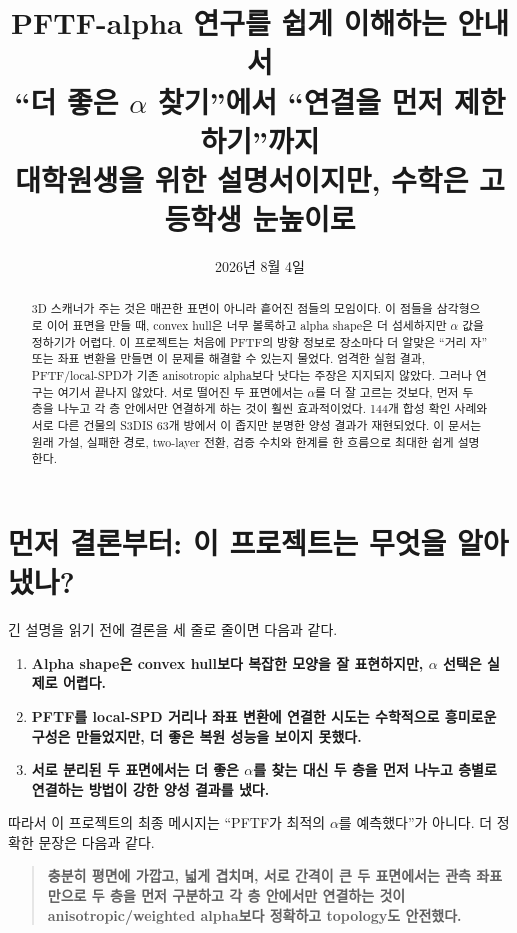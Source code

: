 \documentclass[11pt,a4paper]{article}
\title{\textbf{PFTF-alpha 연구를 쉽게 이해하는 안내서}\\[5pt]
\large ``더 좋은 $\alpha$ 찾기''에서 ``연결을 먼저 제한하기''까지\\[7pt]
\normalsize 대학원생을 위한 설명서이지만, 수학은 고등학생 눈높이로}
\author{}
\date{2026년 8월 4일}
\begin{document}
\maketitle
\thispagestyle{fancy}

\begin{abstract}
\noindent
3D 스캐너가 주는 것은 매끈한 표면이 아니라 흩어진 점들의 모임이다. 이 점들을
삼각형으로 이어 표면을 만들 때, convex hull은 너무 볼록하고 alpha shape은
더 섬세하지만 $\alpha$ 값을 정하기가 어렵다. 이 프로젝트는 처음에 PFTF의
방향 정보로 장소마다 더 알맞은 ``거리 자'' 또는 좌표 변환을 만들면 이 문제를
해결할 수 있는지 물었다. 엄격한 실험 결과, PFTF/local-SPD가 기존 anisotropic
alpha보다 낫다는 주장은 지지되지 않았다. 그러나 연구는 여기서 끝나지 않았다.
서로 떨어진 두 표면에서는 $\alpha$를 더 잘 고르는 것보다, 먼저 두 층을 나누고
각 층 안에서만 연결하게 하는 것이 훨씬 효과적이었다. 144개 합성 확인 사례와
서로 다른 건물의 S3DIS 63개 방에서 이 좁지만 분명한 양성 결과가 재현되었다.
이 문서는 원래 가설, 실패한 경로, two-layer 전환, 검증 수치와 한계를 한 흐름으로
최대한 쉽게 설명한다.
\end{abstract}

\tableofcontents
\newpage

\section{먼저 결론부터: 이 프로젝트는 무엇을 알아냈나?}

긴 설명을 읽기 전에 결론을 세 줄로 줄이면 다음과 같다.

\begin{enumerate}
  \item \textbf{Alpha shape은 convex hull보다 복잡한 모양을 잘 표현하지만,
  $\alpha$ 선택은 실제로 어렵다.}
  \item \textbf{PFTF를 local-SPD 거리나 좌표 변환에 연결한 시도는 수학적으로
  흥미로운 구성은 만들었지만, 더 좋은 복원 성능을 보이지 못했다.}
  \item \textbf{서로 분리된 두 표면에서는 더 좋은 $\alpha$를 찾는 대신 두 층을
  먼저 나누고 층별로 연결하는 방법이 강한 양성 결과를 냈다.}
\end{enumerate}

따라서 이 프로젝트의 최종 메시지는 ``PFTF가 최적의 $\alpha$를 예측했다''가
아니다. 더 정확한 문장은 다음과 같다.

\begin{quote}
\textbf{충분히 평면에 가깝고, 넓게 겹치며, 서로 간격이 큰 두 표면에서는
관측 좌표만으로 두 층을 먼저 구분하고 각 층 안에서만 연결하는 것이
anisotropic/weighted alpha보다 정확하고 topology도 안전했다.}
\end{quote}
\end{document}

